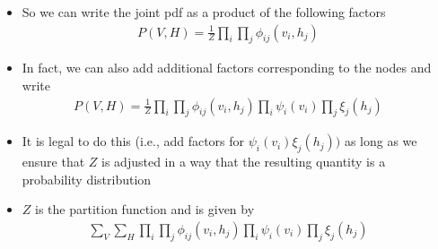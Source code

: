 \begin{frame}
	\begin{columns}
		\begin{overlayarea}{\textwidth}{\textheight}
			
		\end{overlayarea}
		\begin{overlayarea}{\textwidth}{\textheight}
			\footnotesize{
				\begin{itemize}\justifying
					\item<1-> So we can write the joint pdf as a product of the following factors
					\begin{align*}
					P(V, H) = \frac{1}{Z}\prod_i\prod_j \phi_{ij}(v_i, h_j)
					\end{align*}
					\item<2-> In fact, we can also add additional factors corresponding to the nodes and write
					\begin{align*}
					P(V, H) = \frac{1}{Z}\prod_i\prod_j \phi_{ij}(v_i, h_j) \prod_i \psi_i(v_i) \prod_j \xi_j(h_j) 
					\end{align*}
					\item<3-> It is legal to do this (i.e., add factors for $\psi_i(v_i) \xi_j(h_j))$ as long as we ensure that $Z$ is adjusted in a way that the resulting quantity is a probability distribution
					\item<4-> $Z$ is the partition function and is given by
					\begin{align*}
					\sum_V \sum_H \prod_i\prod_j \phi_{ij}(v_i, h_j) \prod_i \psi_i(v_i) \prod_j \xi_j(h_j)
					\end{align*}
				\end{itemize}
			}
		\end{overlayarea}
	\end{columns}
\end{frame}

